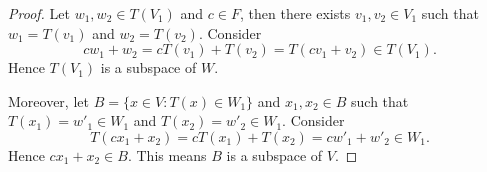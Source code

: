 \begin{Exercise}
	\begin{proof}
		Let $w_1, w_2\in T(V_1)$ and $c\in F$, then there exists $v_1, v_2\in V_1$ such that $w_1 = T(v_1)$ and $w_2 = T(v_2)$. Consider
		$$
		c w_1+w_2 = c T(v_1) + T(v_2) = T(c v_1 + v_2) \in T(V_1).
		$$
		Hence $T(V_1)$ is a subspace of $W$.
		
		Moreover, let $B = \{x\in V: T(x)\in W_1\}$ and $x_1, x_2\in B$ such that $T(x_1) = w'_1\in W_1$ and $T(x_2) = w'_2\in W_1$. Consider
		$$
		T(c x_1 + x_2) = c T(x_1) + T(x_2) = c w'_1 + w'_2 \in W_1.
		$$
		Hence $c x_1 + x_2\in B$. This means $B$ is a subspace of $V$.
	\end{proof}
\end{Exercise}